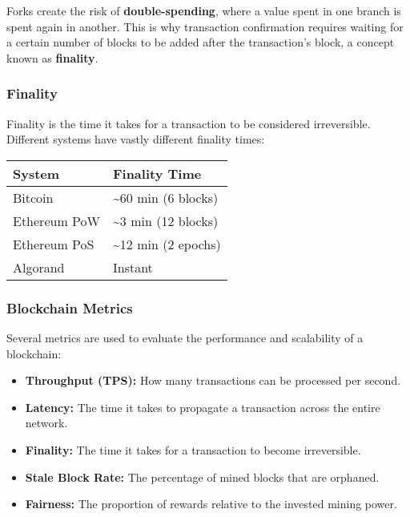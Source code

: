 
Forks create the risk of \textbf{double-spending}, where a value spent
in one branch is spent again in another. This is why transaction
confirmation requires waiting for a certain number of blocks to be added
after the transaction's block, a concept known as \textbf{finality}.

\subsubsection{Finality}\label{finality}

Finality is the time it takes for a transaction to be considered
irreversible. Different systems have vastly different finality times:

\begin{center}
\begin{tabular}{ll}
	\toprule
	System & Finality Time \\
	\midrule
	Bitcoin & \textasciitilde60 min (6 blocks) \\
	Ethereum PoW & \textasciitilde3 min (12 blocks) \\
	Ethereum PoS & \textasciitilde12 min (2 epochs) \\
	Algorand & Instant \\
	\bottomrule
		
\end{tabular}
\end{center}

\subsubsection{Blockchain Metrics}\label{blockchain-metrics}

Several metrics are used to evaluate the performance and scalability of
a blockchain:

\begin{itemize}
\tightlist
\item
  \textbf{Throughput (TPS):} How many transactions can be processed per
  second.
\item
  \textbf{Latency:} The time it takes to propagate a transaction across
  the entire network.
\item
  \textbf{Finality:} The time it takes for a transaction to become
  irreversible.
\item
  \textbf{Stale Block Rate:} The percentage of mined blocks that are
  orphaned.
\item
  \textbf{Fairness:} The proportion of rewards relative to the invested
  mining power.
\end{itemize}

